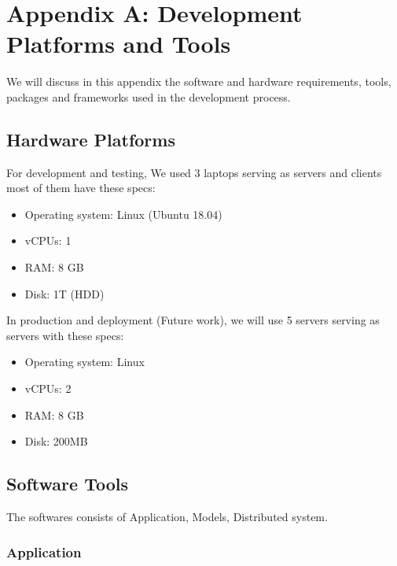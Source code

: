 \newpage
\section*{Appendix A: Development Platforms and Tools}


We will discuss in this appendix the software and hardware requirements, tools, packages and frameworks used in the development process.

\subsection*{Hardware Platforms}

For development and testing, We used 3 laptops serving as servers and clients most of them have these specs:
\begin{itemize}
    \item Operating system: Linux (Ubuntu 18.04)
    \item vCPUs: 1
    \item RAM: 8 GB
    \item Disk: 1T (HDD)
\end{itemize}


In production and deployment (Future work), we will use 5 servers serving as servers with these specs:
\begin{itemize}
    \item Operating system: Linux
    \item vCPUs: 2
    \item RAM: 8 GB
    \item Disk: 200MB
\end{itemize}
\subsection*{Software Tools}
The softwares consists of Application, Models, Distributed system.
\subsubsection{Application}

